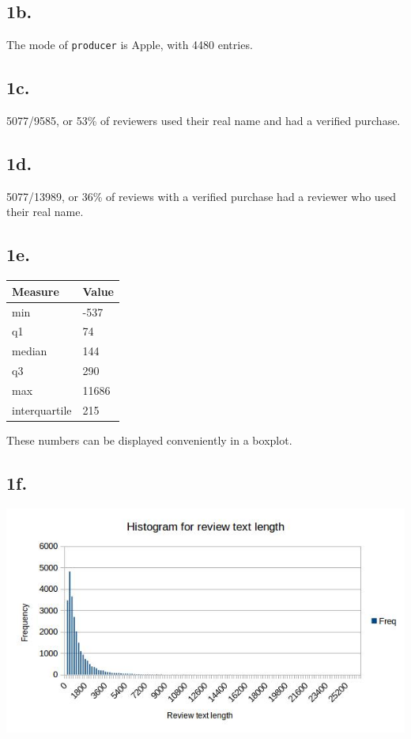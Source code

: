 \documentclass{article}
\begin{document}
\subsection{1b.}
The mode of \texttt{producer} is Apple, with 4480 entries.

\subsection{1c.}
5077/9585, or 53\% of reviewers used their real name and had a verified purchase.

\subsection{1d.}
5077/13989, or 36\% of reviews with a verified purchase had a reviewer who used their real name.

\subsection{1e.}
\begin{table}[h]
\begin{center}
\begin{tabular}{|l|l|}
\hline
\textbf{Measure} & \textbf{Value} \\ \hline
min              & -537           \\ \hline
q1               & 74             \\ \hline
median           & 144            \\ \hline
q3				 & 290			  \\ \hline
max              & 11686          \\ \hline
interquartile    & 215            \\ \hline
\end{tabular}
\end{center}
\end{table}
These numbers can be displayed conveniently in a boxplot.

\subsection{1f.} 
\begin{center}
\includegraphics[keepaspectratio, scale=0.5]{histogram2.jpg}
\end{center}
\end{document}

